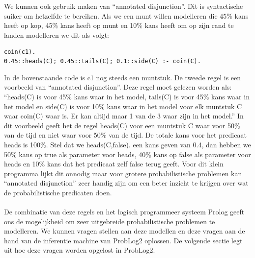 \documentclass[12pt,a4paper,oneside]{book}
\theoremstyle{definition}
\newcommand{\quotes}[1]{``#1''}
\begin{document}
\\\\
We kunnen ook gebruik maken van \quotes{annotated disjunction}. Dit is syntactische suiker om hetzelfde te bereiken. Als we een munt willen modelleren die 45\% kans heeft op kop, 45\% kans heeft op munt en 10\% kans heeft om op zijn rand te landen modelleren we dit als volgt:
\begin{lstlisting}
coin(c1).
0.45::heads(C); 0.45::tails(C); 0.1::side(C) :- coin(C).
\end{lstlisting}
In de bovenstaande code is c1 nog steeds een muntstuk. De tweede regel is een voorbeeld van \quotes{annotated disjunction}. Deze regel moet gelezen worden als: \quotes{heads(C) is voor 45\% kans waar in het model, tails(C) is voor 45\% kans waar in het model en side(C) is voor 10\% kans waar in het model voor elk muntstuk C waar coin(C) waar is. Er kan altijd maar 1 van de 3 waar zijn in het model.}
In dit voorbeeld geeft het de regel heads(C) voor een muntstuk C waar voor 50\% van de tijd en niet waar voor 50\% van de tijd. De totale kans voor het predicaat heads is 100\%. Stel dat we heads(C,false). een kans geven van 0.4, dan hebben we 50\% kans op true als parameter voor heads, 40\% kans op false als parameter voor heads en 10\% kans dat het predicaat zelf false terug geeft. Voor dit klein programma lijkt dit onnodig maar voor grotere probabilistische problemen kan “annotated disjunction” zeer handig zijn om een beter inzicht te krijgen over wat de probabilistische predicaten doen.
\\\\
De combinatie van deze regels en het logisch programmeer systeem Prolog geeft ons de mogelijkheid om zeer uitgebreide probabilistische problemen te modelleren. We kunnen vragen stellen aan deze modellen en deze vragen aan de hand van de inferentie machine van ProbLog2 oplossen. De volgende sectie legt uit hoe deze vragen worden opgelost in ProbLog2.
\end{document}
